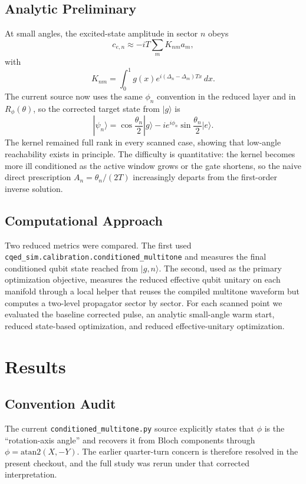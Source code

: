 \documentclass[aps,pra,twocolumn,reprint,amsmath,amssymb]{revtex4-2}
\begin{document}
\subsection{Analytic Preliminary}
At small angles, the excited-state amplitude in sector $n$ obeys
\begin{equation}
c_{e,n} \approx -iT\sum_m K_{nm} a_m,
\end{equation}
with
\begin{equation}
K_{nm} = \int_0^1 g(x)e^{i(\Delta_n-\Delta_m)Tx}\,dx.
\end{equation}
The current source now uses the same $\phi_n$ convention in the reduced layer and in $R_\phi(\theta)$, so the corrected target state from $|g\rangle$ is
\begin{equation}
|\psi_n\rangle = \cos\frac{\theta_n}2 |g\rangle - i e^{i\phi_n}\sin\frac{\theta_n}2 |e\rangle.
\end{equation}
The kernel remained full rank in every scanned case, showing that low-angle reachability exists in principle. The difficulty is quantitative: the kernel becomes more ill conditioned as the active window grows or the gate shortens, so the naive direct prescription $A_n=\theta_n/(2T)$ increasingly departs from the first-order inverse solution.

\subsection{Computational Approach}
Two reduced metrics were compared. The first used \texttt{cqed\_sim.calibration.conditioned\_multitone} and measures the final conditioned qubit state reached from $|g,n\rangle$. The second, used as the primary optimization objective, measures the reduced effective qubit unitary on each manifold through a local helper that reuses the compiled multitone waveform but computes a two-level propagator sector by sector. For each scanned point we evaluated the baseline corrected pulse, an analytic small-angle warm start, reduced state-based optimization, and reduced effective-unitary optimization.

\section{Results}
\subsection{Convention Audit}
The current \texttt{conditioned\_multitone.py} source explicitly states that $\phi$ is the ``rotation-axis angle'' and recovers it from Bloch components through $\phi=\mathrm{atan2}(X,-Y)$. The earlier quarter-turn concern is therefore resolved in the present checkout, and the full study was rerun under that corrected interpretation.
\end{document}
